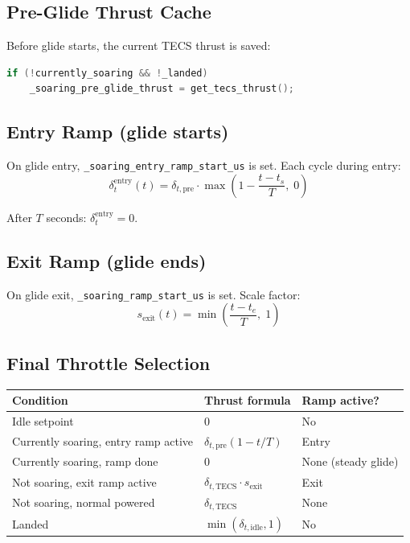 \documentclass[12pt,a4paper]{article}
\begin{document}
\subsection{Pre-Glide Thrust Cache}

Before glide starts, the current TECS thrust is saved:
\begin{lstlisting}[language=C++]
if (!currently_soaring && !_landed)
    _soaring_pre_glide_thrust = get_tecs_thrust();
\end{lstlisting}

\subsection{Entry Ramp (glide starts)}

On glide entry, \texttt{\_soaring\_entry\_ramp\_start\_us} is set.
Each cycle during entry:
\begin{equation}
  \delta_t^{\text{entry}}(t) = \delta_{t,\text{pre}} \cdot
    \max\!\left(1 - \frac{t - t_s}{T},\;0\right)
\end{equation}

After $T$ seconds: $\delta_t^{\text{entry}} = 0$.

\subsection{Exit Ramp (glide ends)}

On glide exit, \texttt{\_soaring\_ramp\_start\_us} is set.
Scale factor:
\begin{equation}
  s_{\text{exit}}(t) = \min\!\left(\frac{t - t_e}{T},\;1\right)
\end{equation}

\subsection{Final Throttle Selection}

\begin{center}
\begin{tabular}{lll}
\toprule
Condition & Thrust formula & Ramp active? \\
\midrule
Idle setpoint & $0$ & No \\
Currently soaring, entry ramp active & $\delta_{t,\text{pre}} (1 - t/T)$ & Entry \\
Currently soaring, ramp done & $0$ & None (steady glide) \\
Not soaring, exit ramp active & $\delta_{t,\text{TECS}} \cdot s_{\text{exit}}$ & Exit \\
Not soaring, normal powered & $\delta_{t,\text{TECS}}$ & None \\
Landed & $\min(\delta_{t,\text{idle}}, 1)$ & No \\
\bottomrule
\end{tabular}
\end{center}
\end{document}
